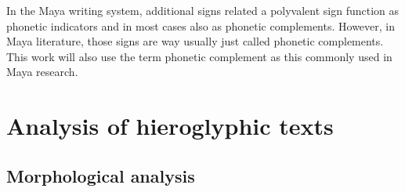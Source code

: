 \documentclass[../main.tex]{subfiles}
\begin{document}
In the Maya writing system, additional signs related a polyvalent sign function 
as phonetic indicators and in most cases also as phonetic complements.
However, in Maya literature, those signs are way usually just called phonetic complements.
This work will also use the term phonetic complement as this commonly used in Maya research.

\section{Analysis of hieroglyphic texts}

\subsection{Morphological analysis}
\end{document}
